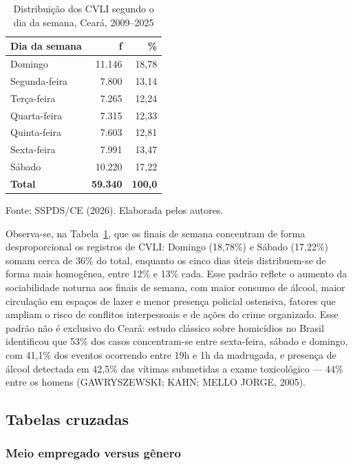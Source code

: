 \documentclass[12pt,a4paper]{article}
\newcommand{\fonte}[1]{  \vspace{-2mm}
  \begin{center}\footnotesize Fonte: #1\end{center}
}
\begin{document}
\begin{table}[H]
\centering
\caption{Distribuição dos CVLI segundo o dia da semana, Ceará, 2009--2025}
\label{tab:diasemana}
\begin{tabular}{lrr}
\toprule
\textbf{Dia da semana} & \textbf{f} & \textbf{\%} \\
\midrule
Domingo        & 11.146 & 18,78 \\
Segunda-feira  & 7.800  & 13,14 \\
Terça-feira    & 7.265  & 12,24 \\
Quarta-feira   & 7.315  & 12,33 \\
Quinta-feira   & 7.603  & 12,81 \\
Sexta-feira    & 7.991  & 13,47 \\
Sábado         & 10.220 & 17,22 \\
\midrule
\textbf{Total} & \textbf{59.340} & \textbf{100,0} \\
\bottomrule
\end{tabular}
\end{table}
\fonte{SSPDS/CE (2026). Elaborada pelos autores.}

Observa-se, na Tabela~\ref{tab:diasemana}, que os finais de semana concentram de forma desproporcional os registros de CVLI: Domingo (18,78\%) e Sábado (17,22\%) somam cerca de 36\% do total, enquanto os cinco dias úteis distribuem-se de forma mais homogênea, entre 12\% e 13\% cada. Esse padrão reflete o aumento da sociabilidade noturna aos finais de semana, com maior consumo de álcool, maior circulação em espaços de lazer e menor presença policial ostensiva, fatores que ampliam o risco de conflitos interpessoais e de ações do crime organizado. Esse padrão não é exclusivo do Ceará: estudo clássico sobre homicídios no Brasil identificou que 53\% dos casos concentram-se entre sexta-feira, sábado e domingo, com 41,1\% dos eventos ocorrendo entre 19h e 1h da madrugada, e presença de álcool detectada em 42,5\% das vítimas submetidas a exame toxicológico --- 44\% entre os homens (GAWRYSZEWSKI; KAHN; MELLO JORGE, 2005).

\subsection{Tabelas cruzadas}

\subsubsection{Meio empregado versus gênero}
\end{document}
